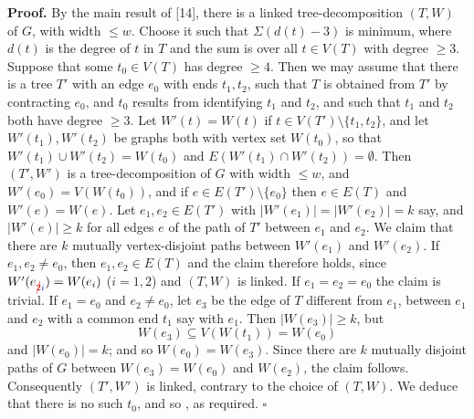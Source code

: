 \textbf{Proof.} By the main result of [14], there is a linked tree-decomposition $(T, W)$ of $G$, with width $\le w$. Choose it such that $\Sigma(d(t) - 3)$ is minimum, where $d(t)$ is the degree of $t$ in $T$ and the sum is over all $t \in V(T)$ with degree $\ge 3$. Suppose that some $t_0 \in V(T)$ has degree $\ge 4$. Then we may assume that there is a tree $T'$ with an edge $e_0$ with ends $t_1, t_2$, such that $T$ is obtained from $T'$ by contracting $e_0$, and $t_0$ results from identifying $t_1$ and $t_2$, and such that $t_1$ and $t_2$ both have degree $\ge 3$. Let $W'(t) = W(t)$ if $t \in V(T') \setminus \{t_1, t_2\}$, and let $W'(t_1), W'(t_2)$ be graphs both with vertex set $W(t_0)$, so that $W'(t_1) \cup W'(t_2) = W(t_0)$ and $E(W'(t_1) \cap W'(t_2)) = \emptyset$. Then $(T', W')$ is a tree-decomposition of $G$ with width $\le w$, and $W'(e_0) = V(W(t_0))$, and if $e \in E(T') \setminus \{e_0\}$ then $e \in E(T)$ and $W'(e) = W(e)$. Let $e_1, e_2 \in E(T')$ with $|W'(e_1)| = |W'(e_2)| = k$ say, and $|W'(e)| \ge k$ for all edges $e$ of the path of $T'$ between $e_1$ and $e_2$. We claim that there are $k$ mutually vertex-disjoint paths between $W'(e_1)$ and $W'(e_2)$. If $e_1, e_2 \ne e_0$, then $e_1, e_2 \in E(T)$ and the claim therefore holds, since $W'(e_{\delm{2}\fix{i}}) = W(e_i)$ ($i = 1, 2$) and $(T, W)$ is linked. If $e_1 = e_2 = e_0$ the claim is trivial. If $e_1 = e_0$ and $e_2 \ne e_0$, let $e_3$ be the edge of $T$ different from $e_1$, between $e_1$ and $e_2$ with a common end $t_1$ say with $e_1$. Then $|W(e_3)| \ge k$, but
\begin{equation*}
W(e_3) \subseteq V(W(t_1)) = W(e_0)
\end{equation*}
and $|W(e_0)| = k$; and so $W(e_0) = W(e_3)$. Since there are $k$ mutually disjoint paths of $G$ between $W(e_3) = W(e_0)$ and $W(e_2)$, the claim follows. Consequently $(T', W')$ is linked, contrary to the choice of $(T, W)$. We deduce that there is no such $t_0$, and so , as required. $\square$

